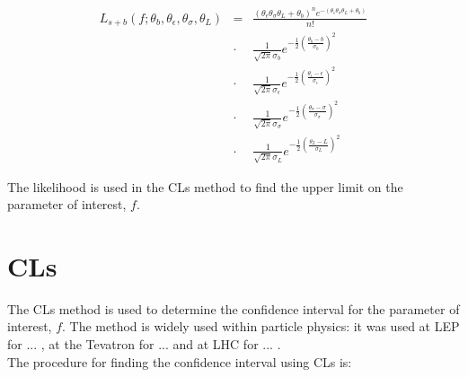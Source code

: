 \begin{eqnarray}
L_{s+b}(f; \theta_{b}, \theta_{\epsilon}, \theta_{\sigma}, \theta_{L}) &=&
\frac{(\theta_{\epsilon}\theta_{\sigma}\theta_{L}+\theta_{b})^{n}e^{-(\theta_{\epsilon}\theta_{\sigma}\theta_{L}+\theta_{b})}}{n!}
\nonumber \\
&\cdot&
\frac{1}{\sqrt{2\pi}\sigma_{b}}e^{-\frac{1}{2}\left(\frac{\theta_{b}-b}{\sigma_{b}}\right)^{2}}
\nonumber \\
&\cdot&
\frac{1}{\sqrt{2\pi}\sigma_{\epsilon}}e^{-\frac{1}{2}\left(\frac{\theta_{\epsilon}-\epsilon}{\sigma_{\epsilon}}\right)^{2}}
\nonumber \\
&\cdot&
\frac{1}{\sqrt{2\pi}\sigma_{\sigma}}e^{-\frac{1}{2}\left(\frac{\theta_{\sigma}-\sigma}{\sigma_{\sigma}}\right)^{2}}
\nonumber \\
&\cdot& 
\frac{1}{\sqrt{2\pi}\sigma_{L}}e^{-\frac{1}{2}\left(\frac{\theta_{L}-L}{\sigma_{L}}\right)^{2}} 
\label{eq:Full_Likelihood}
\end{eqnarray}

The likelihood is used in the CLs method to find the upper limit on the
parameter of interest, $f$.

\section{CLs}

The CLs method is used to determine the confidence interval for the parameter of
interest, $f$. The method is widely used within particle physics: it was used at
LEP for ... \cite{cls_lep}, at the Tevatron for ... \cite{cls_tevatron} and at
LHC for ... \cite{cls_lhc}. \\

The procedure for finding the confidence interval using CLs is:

